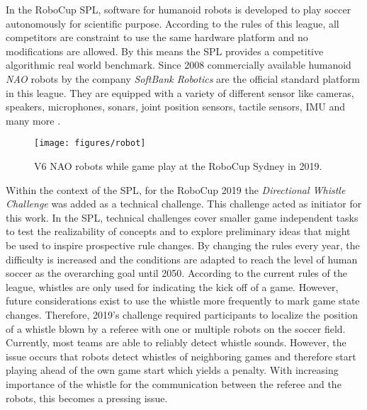 In the \ac{RoboCup} \ac{SPL}, software for humanoid robots is developed to
play soccer autonomously for scientific purpose.
According to the rules of this league, all competitors are constraint to use the
same hardware platform and no modifications are allowed. By this means the \ac{SPL}
provides a competitive algorithmic real world benchmark.
Since 2008 commercially available humanoid \textit{NAO} robots by the company
\textit{SoftBank Robotics} are the official standard platform in this league.
They are equipped with a variety of different sensor like cameras, speakers,
microphones, sonars, joint position sensors, tactile sensors, \ac{IMU}
and many more \cite{nao_docu}.
\begin{figure}[ht]
	\centering
        \texttt{[image: figures/robot]}
	\caption[NAO robot]{V6 NAO robots while game play at the \ac{RoboCup} Sydney in 2019.}
	\label{fig:01_robot}
\end{figure}

Within the context of the \ac{SPL}, for the \ac{RoboCup} 2019 the \textit{Directional
Whistle Challenge} was added as a technical challenge. This challenge acted as
initiator for this work. In the \ac{SPL}, technical challenges cover smaller
game independent tasks to test the realizability of concepts and to explore
preliminary ideas that might be used to inspire prospective rule changes. By
changing the rules every year, the difficulty is increased and the conditions
are adapted to reach the level of human soccer as the overarching goal until
2050. According to the current rules of the league,
whistles are only used for indicating the kick off of a game. However,
future considerations exist to use the whistle more frequently to mark
game state changes. Therefore, 2019's challenge required participants to
localize the position of a whistle blown by a referee with one or
multiple robots on the soccer field.
Currently, most teams are able to reliably detect whistle sounds. However, the
issue occurs that robots detect whistles of neighboring games and therefore
start playing ahead of the own game start which yields a penalty. With
increasing importance of the whistle for the communication between the referee
and the robots, this becomes a pressing issue.

